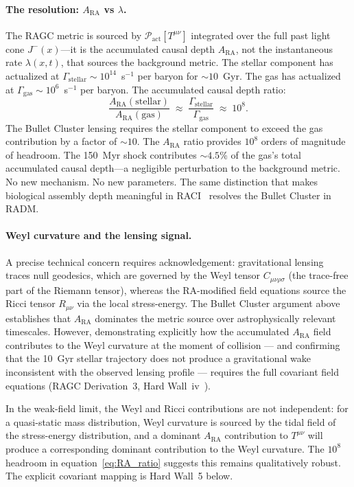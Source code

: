 \documentclass[11pt,a4paper]{article}
\theoremstyle{plain}
\theoremstyle{definition}
\theoremstyle{remark}
\newcommand{\Pact}{\mathcal{P}_{\mathrm{act}}}
\newcommand{\ARA}{A_{\mathrm{RA}}}
\begin{document}
\paragraph{The resolution: $A_{\mathrm{RA}}$ vs $\lambda$.}
The RAGC metric is sourced by $\Pact[T^{\mu\nu}]$ integrated over the full past
light cone $J^-(x)$---it is the accumulated causal depth $\ARA$, not the
instantaneous rate $\lambda(x,t)$, that sources the background metric. The
stellar component has actualized at $\Gamma_{\mathrm{stellar}} \sim
10^{14}$~s$^{-1}$ per baryon for $\sim 10$~Gyr. The gas has actualized at
$\Gamma_{\mathrm{gas}} \sim 10^6$~s$^{-1}$ per baryon. The accumulated
causal depth ratio:
\begin{equation}
  \frac{\ARA(\mathrm{stellar})}{\ARA(\mathrm{gas})}
  \;\approx\; \frac{\Gamma_{\mathrm{stellar}}}{\Gamma_{\mathrm{gas}}}
  \;\approx\; 10^8.
  \label{eq:RA_ratio_simplified}
\end{equation}
The Bullet Cluster lensing requires the stellar component to exceed the gas
contribution by a factor of $\sim 10$. The $\ARA$ ratio provides $10^8$
orders of magnitude of headroom. The 150~Myr shock contributes $\sim 4.5$\% of
the gas's total accumulated causal depth---a negligible perturbation to the
background metric. No new mechanism. No new parameters. The same distinction
that makes biological assembly depth meaningful in RACI~\citep{Sandeman2026c}
resolves the Bullet Cluster in RADM.

\paragraph{Weyl curvature and the lensing signal.}
A precise technical concern requires acknowledgement: gravitational lensing traces
null geodesics, which are governed by the Weyl tensor $C_{\mu\nu\rho\sigma}$
(the trace-free part of the Riemann tensor), whereas the RA-modified field
equations source the Ricci tensor $R_{\mu\nu}$ via the local stress-energy.
The Bullet Cluster argument above establishes that $\ARA$ dominates the metric
source over astrophysically relevant timescales. However, demonstrating explicitly
how the accumulated $\ARA$ field contributes to the Weyl curvature at the moment
of collision --- and confirming that the 10~Gyr stellar trajectory does not
produce a gravitational wake inconsistent with the observed lensing profile ---
requires the full covariant field equations (RAGC Derivation~3,
Hard Wall~iv~\citep{Sandeman2026b}).

In the weak-field limit, the Weyl and Ricci contributions are not independent:
for a quasi-static mass distribution, Weyl curvature is sourced by the tidal
field of the stress-energy distribution, and a dominant $\ARA$ contribution to
$T^{\mu\nu}$ will produce a corresponding dominant contribution to the Weyl
curvature. The $10^8$ headroom in equation~\eqref{eq:RA_ratio} suggests this
remains qualitatively robust. The explicit covariant mapping is Hard Wall~5
below.
\end{document}
